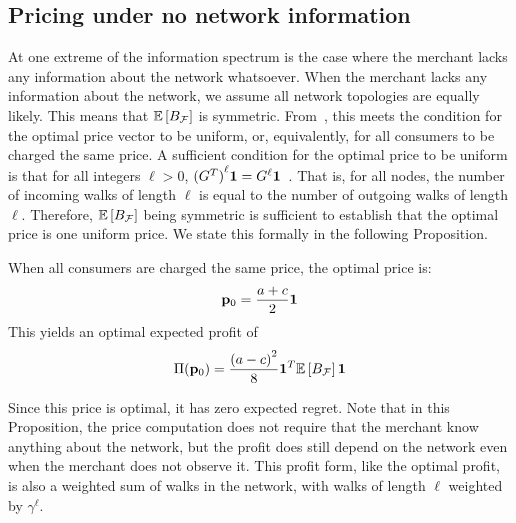 \subsection{Pricing under no network information}


At one extreme of the information spectrum is the case where the merchant lacks any information about the network whatsoever. When the merchant lacks any information about the network, we assume all network topologies are equally likely. This means that $\mathbb{E}\left[ B_\mathcal{F}\right]$ is symmetric. From~\cite{huang2022value}, this meets the condition for the optimal price vector to be uniform, or, equivalently, for all consumers to be charged the same price. A sufficient condition for the optimal price to be uniform is that for all integers $\ell > 0$, ${({G^T})}^{\ell} \mathbf{1} = G^\ell \mathbf{1}$~\cite{huang2022value}. That is, for all nodes, the number of incoming walks of length $\ell$ is equal to the number of outgoing walks of length $\ell$. Therefore, $\mathbb{E}\left[ B_\mathcal{F}\right]$ being symmetric is sufficient to establish that the optimal price is one uniform price. We state this formally in the following Proposition.

\begin{proposition}
        When all consumers are charged the same price, the optimal price is:
    \begin{equation}
        \mathbf{p}_0 = \frac{a+c}{2} \mathbf{1} 
    \end{equation}
        This yields an optimal expected profit of
        \begin{equation}
        \Pi(\mathbf{p}_0) = \frac{{(a-c)}^2}{8} \mathbf{1}^T \mathbb{E}\left[ B_\mathcal{F}\right] \mathbf{1}
    \end{equation}
\end{proposition}


Since this price is optimal, it has zero expected regret. Note that in this Proposition, the price computation does not require that the merchant know anything about the network, but the profit does still depend on the network even when the merchant does not observe it. This profit form, like the optimal profit, is also a weighted sum of walks in the network, with walks of length $\ell$ weighted by $\gamma^\ell$.

